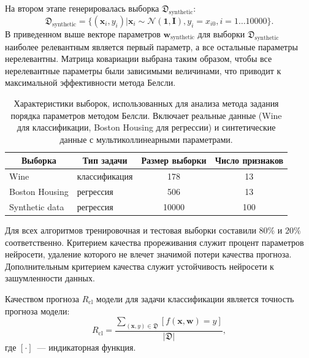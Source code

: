 На втором этапе генерировалась выборка $\mathfrak{D}_{\text{synthetic}}$:
\[
    \mathfrak{D}_{\text{synthetic}} = \{(\textbf{x}_i,y_i)| \textbf{x}_i \sim  \mathcal{N}(\textbf{1}, \textbf{I}), y_i = x_{i0}, i = 1 \ldots 10000\}.
\]
В приведенном выше векторе параметров $\mathbf{w}_{\text{synthetic}}$ для выборки $\mathfrak{D}_{\text{synthetic}}$ наиболее релевантным является первый параметр, а все остальные параметры нерелевантны. Матрица ковариации выбрана таким образом, чтобы все нерелевантные параметры были зависимыми величинами, что приводит к максимальной эффективности метода Белсли.

\begin{table}[h!t]

\begin{center}
\caption{Характеристики выборок, использованных для анализа метода задания порядка параметров методом Белсли. Включает реальные данные (Wine для классификации, Boston Housing для регрессии) и синтетические данные с мультиколлинеарными параметрами.}
\begin{tabular}{|c|c|c|c|}
\hline
	Выборка &Тип задачи& Размер выборки& Число признаков\\
	\hline

	\multicolumn{1}{|l|}{Wine}
	&
	\multicolumn{1}{|l|}{классификация}
	 & 178 & 13\\
	\hline

	\multicolumn{1}{|l|}{Boston Housing}
	&
	\multicolumn{1}{|l|}{регрессия}
	& 506 & 13\\
	\hline

	\multicolumn{1}{|l|}{Synthetic data}
	&
	\multicolumn{1}{|l|}{регрессия}
	& 10000 & 100\\
\hline

\end{tabular}
\end{center}
\end{table}

Для всех алгоритмов тренировочная и тестовая выборки составили $80\%$ и $20\%$ соответственно. Критерием качества прореживания служит процент параметров нейросети, удаление которого не влечет значимой потери качества прогноза. Дополнительным критерием качества служит устойчивость нейросети к зашумленности данных.

Качеством прогноза $R_{\mathrm{cl}}$ модели для задачи классификации является точность прогноза модели:
\[
R_{\mathrm{cl}} = \frac{\sum_{(\textbf{x},y)\in \mathfrak{D}} [f(\textbf{x}, \textbf{w}) = y]}{\left|\mathfrak{D}\right|},
\]
где $[\cdot]$~--- индикаторная функция.

